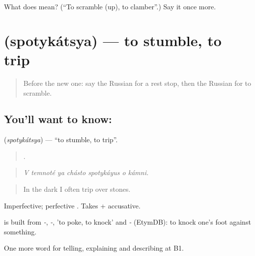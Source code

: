 \begin{tcolorbox}[breakable,colback=teal!4,colframe=teal!35!black,title={Before you move on}]
What does  mean? (\textquotedblleft{}To scramble (up), to clamber\textquotedblright{}.) Say it once more.
\end{tcolorbox}
\section[\texorpdfstring{\ru{спотыкаться} (spotykátsya)}{спотыкаться (spotykátsya)}]{ (spotykátsya) — to stumble, to trip}

\label{lesson:RU-C459-spotykatsya}



\begin{quote}
Before the new one: say the Russian for a rest stop, then the Russian for to scramble.
\end{quote}

\subsection*{You'll want to know: }
\textbf{} (\emph{spotykátsya}) — \textquotedblleft{}to stumble, to trip\textquotedblright{}.

\begin{quote}
      .
\end{quote}

\begin{quote}
\emph{V temnoté ya chásto spotykáyus o kámni.}
\end{quote}

\begin{quote}
In the dark I often trip over stones.
\end{quote}

Imperfective; perfective \emph{}. Takes \emph{} + accusative.

\begin{cousinweb}
\emph{} is built from \emph{-}, \emph{-}, \emph{} 'to poke, to knock' and \emph{-} (EtymDB): to knock one's foot against something.
\end{cousinweb}

\begin{grammarlens}[title={What you've built}]
One more word for telling, explaining and describing at B1.
\end{grammarlens}

